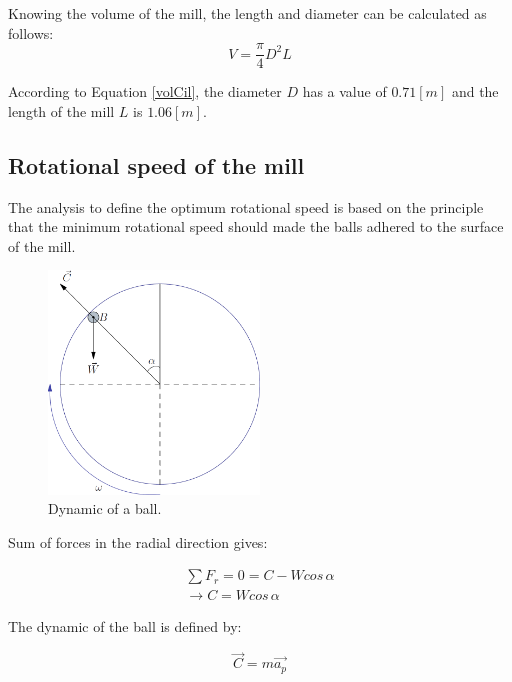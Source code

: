 Knowing the volume of the mill, the length and diameter can be calculated as follows:
\begin{equation}
V = \frac{\pi}{4} D^2 L
\label{volCil}
\end{equation}

According to Equation \ref{volCil}, the diameter $D$ has a value of $0.71 [m]$ and the length of the mill $L$ is $1.06[m]$.

\subsection{Rotational speed of the mill}

The analysis to define the optimum rotational speed is based on the principle that the minimum rotational speed should made the balls adhered to the surface of the mill.

\begin{figure}[H]
\centering
\includegraphics[width=0.5\textwidth]{Images/Preprocesamiento/DBola.PNG}
\caption{Dynamic of a ball.}
\label{DBall}
\end{figure}

Sum of forces in the radial direction gives:

\begin{equation}
\begin{array}{c}
        \sum F_r = 0 = C - W cos \, \alpha \\
        \rightarrow \boxed{C = W cos \, \alpha}
        \label{Fr}
\end{array}
\end{equation}

The dynamic of the ball is defined by:

\begin{equation}
        \vec{C} = m \vec{a_p} 
        \label{dinB}
\end{equation}


